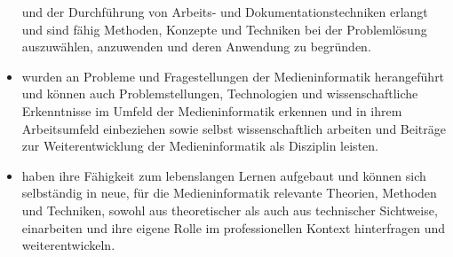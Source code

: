 \begin{itemize}
  und der Durchführung von Arbeits- und Dokumentationstechniken erlangt
  und sind fähig Methoden, Konzepte und Techniken bei der Problemlösung
  auszuwählen, anzuwenden und deren Anwendung zu begründen.
\item
  wurden an Probleme und Fragestellungen der Medieninformatik
  herangeführt und können auch Problemstellungen, Technologien und
  wissenschaftliche Erkenntnisse im Umfeld der Medieninformatik erkennen
  und in ihrem Arbeitsumfeld einbeziehen sowie selbst wissenschaftlich
  arbeiten und Beiträge zur Weiterentwicklung der Medieninformatik als
  Disziplin leisten.
\item
  haben ihre Fähigkeit zum lebenslangen Lernen aufgebaut und können sich
  selbständig in neue, für die Medieninformatik relevante Theorien,
  Methoden und Techniken, sowohl aus theoretischer als auch aus
  technischer Sichtweise, einarbeiten und ihre eigene Rolle im
  professionellen Kontext hinterfragen und weiterentwickeln.
\end{itemize}
